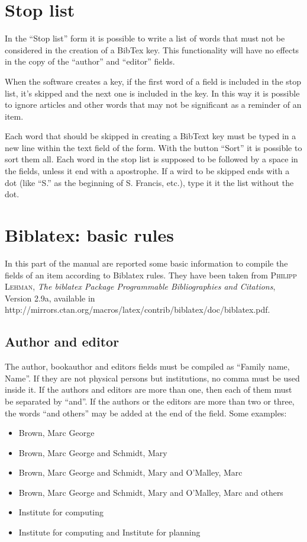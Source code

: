 \documentclass[a4paper,12pt]{report}
\begin{document}
\chapter{Stop list}

In the “Stop list” form it is possible to write a list of words that must not be considered in the creation of a BibTex key. This functionality will have no effects in the copy of the “author” and “editor” fields.

When the software creates a key, if the first word of a field is included in the stop list, it's skipped and the next one is included in the key. In this way it is possible to ignore articles and other words that may not be significant as a reminder of an item.

Each word that should be skipped in creating a BibText key must be typed in a new line within the text field of the form. With the button “Sort” it is possible to sort them all. Each word in the stop list is supposed to be followed by a space in the fields, unless it end with a apostrophe. If a wird to be skipped ends with a dot (like “S.” as the beginning of S. Francis, etc.), type it it the list without the dot.

\chapter{Biblatex: basic rules}

In this part of the manual are reported some basic information to compile the fields of an item according to Biblatex rules. They have been taken from \textsc{Philipp Lehman}, \textit{The biblatex Package Programmable Bibliographies and Citations}, Version 2.9a, available in http://mirrors.ctan.org/macros/latex/contrib/biblatex/doc/biblatex.pdf.

\section{Author and editor}

The author, bookauthor and editors fields must be compiled as “Family name, Name”. If they are not physical persons but institutions, no comma must be used inside it. If the authors and editors are more than one, then each of them must be separated by “and”.  If the authors or the editors are more than two or three, the words “and others” may be added at the end of the field. Some examples:
\begin{itemize}
  \item Brown, Marc George
  \item Brown, Marc George and Schmidt, Mary
  \item Brown, Marc George and Schmidt, Mary and O'Malley, Marc
  \item Brown, Marc George and Schmidt, Mary and O'Malley, Marc and others
  \item Institute for computing
  \item Institute for computing and Institute for planning
\end{itemize}
\end{document}
